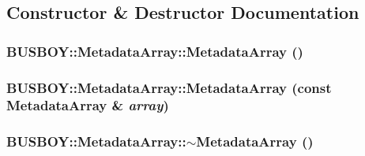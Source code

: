 \subsection{Constructor \& Destructor Documentation}
\hypertarget{classBUSBOY_1_1MetadataArray_ad85416de99d6286fe5cf0b45cfa2d491}{
\subsubsection[{MetadataArray}]{\setlength{\rightskip}{0pt plus 5cm}BUSBOY::MetadataArray::MetadataArray ()}}
\label{classBUSBOY_1_1MetadataArray_ad85416de99d6286fe5cf0b45cfa2d491}
\hypertarget{classBUSBOY_1_1MetadataArray_ae7d919f8a59c20888ab92e5fcfe52eb5}{
\subsubsection[{MetadataArray}]{\setlength{\rightskip}{0pt plus 5cm}BUSBOY::MetadataArray::MetadataArray (const {\bf MetadataArray} \& {\em array})}}
\label{classBUSBOY_1_1MetadataArray_ae7d919f8a59c20888ab92e5fcfe52eb5}
\hypertarget{classBUSBOY_1_1MetadataArray_aff7e5f64948bd6a2e20e5d2f4b1c1ccf}{
\subsubsection[{$\sim$MetadataArray}]{\setlength{\rightskip}{0pt plus 5cm}BUSBOY::MetadataArray::$\sim$MetadataArray ()}}
\label{classBUSBOY_1_1MetadataArray_aff7e5f64948bd6a2e20e5d2f4b1c1ccf}


